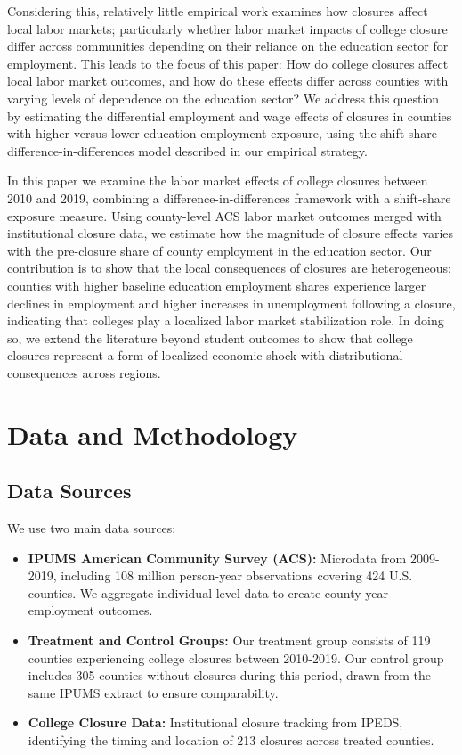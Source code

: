 \documentclass[12pt]{article}
\begin{document}
Considering this, relatively little empirical work examines how closures affect local labor markets; particularly whether labor market impacts of college closure differ across communities depending on their reliance on the education sector for employment. This leads to the focus of this paper: How do college closures affect local labor market outcomes, and how do these effects differ across counties with varying levels of dependence on the education sector? We address this question by estimating the differential employment and wage effects of closures in counties with higher versus lower education employment exposure, using the shift-share difference-in-differences model described in our empirical strategy.

In this paper we examine the labor market effects of college closures between 2010 and 2019, combining a difference-in-differences framework with a shift-share exposure measure. Using county-level ACS labor market outcomes merged with institutional closure data, we estimate how the magnitude of closure effects varies with the pre-closure share of county employment in the education sector. Our contribution is to show that the local consequences of closures are heterogeneous: counties with higher baseline education employment shares experience larger declines in employment and higher increases in unemployment following a closure, indicating that colleges play a localized labor market stabilization role. In doing so, we extend the literature beyond student outcomes to show that college closures represent a form of localized economic shock with distributional consequences across regions.

\section{Data and Methodology}

\subsection{Data Sources}

We use two main data sources:

\begin{itemize}
\item \textbf{IPUMS American Community Survey (ACS):} Microdata from 2009-2019, including 108 million person-year observations covering 424 U.S. counties. We aggregate individual-level data to create county-year employment outcomes.

\item \textbf{Treatment and Control Groups:} Our treatment group consists of 119 counties experiencing college closures between 2010-2019. Our control group includes 305 counties without closures during this period, drawn from the same IPUMS extract to ensure comparability.

\item \textbf{College Closure Data:} Institutional closure tracking from IPEDS, identifying the timing and location of 213 closures across treated counties.
\end{itemize}
\end{document}
